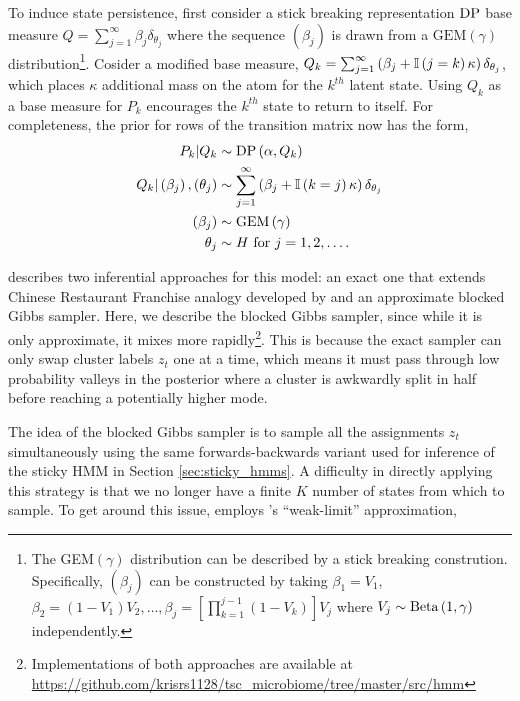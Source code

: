 To induce state persistence, first consider a stick breaking representation
$\textnormal{DP}$ base measure $Q = \sum_{j = 1}^{\infty} \beta_j \delta_{\theta_j}$ where
the sequence $\left(\beta_j\right)$ is drawn from a
$\text{GEM}\left(\gamma\right)$ distribution\footnote{The
  GEM$\left(\gamma\right)$ distribution \citep{gnedin2001characterization} can
  be described by a stick breaking constrution. Specifically,
  $\left(\beta_{j}\right)$ can be constructed by taking $\beta_{1} = V_1$,
  $\beta_2 = \left(1 - V_1\right)V_2, \dots, \beta_{j} = \left[\prod_{k = 1}^{j
      - 1}\left(1 - V_k\right)\right]V_j$ where $V_j \sim \textnormal{Beta}\left(1,
  \gamma\right)$ independently. }. Cosider a modified base measure,
$Q_k = \sum_{j = 1}^{\infty} \left(\beta_j + \mathbb{I}\left({j =
    k}\right)\kappa\right)\delta_{\theta_j}$, which places $\kappa$ additional mass on
  the atom for the $k^{th}$ latent state. Using $Q_k$ as a base measure for
  $P_k$ encourages the $k^{th}$ state to return to itself. For completeness, the
  prior for rows of the transition matrix now has the form,
\begin{align*}
  P_k \vert Q_k &\sim \textnormal{DP}\left(\alpha, Q_k\right) \\
  Q_k \vert \left(\beta_j\right), \left(\theta_j\right) &\sim \sum_{j = 1}^{\infty} \left(\beta_j + \mathbb{I}\left({k = j}\right)\kappa\right)\delta_{\theta_j} \\
  \left(\beta_j\right) &\sim \text{GEM}\left(\gamma\right) \\
  \theta_j &\sim H \text{ for }j = 1, 2, \dots.
\end{align*}

\cite{fox2009bayesian} describes two inferential approaches for this model: an
exact one that extends Chinese Restaurant Franchise analogy developed by
\citep{teh2006hierarchical} and an approximate blocked Gibbs sampler. Here, we
describe the blocked Gibbs sampler, since while it is only approximate, it mixes
more rapidly\footnote{Implementations of both approaches are available at
  \url{https://github.com/krisrs1128/tsc\_microbiome/tree/master/src/hmm}}. This
  is because the exact sampler can only swap cluster labels $z_t$ one at a time,
  which means it must pass through low probability valleys in the posterior
  where a cluster is awkwardly split in half before reaching a potentially
  higher mode.

The idea of the blocked Gibbs sampler is to sample all the assignments $z_t$
simultaneously using the same forwards-backwards variant used for inference of
the sticky HMM in Section \ref{sec:sticky_hmms}. A difficulty in directly
applying this strategy is that we no longer have a finite $K$ number of states
from which to sample. To get around this issue, \cite{fox2008hdp} employs
\cite{ishwaran2002exact}'s ``weak-limit'' approximation,

